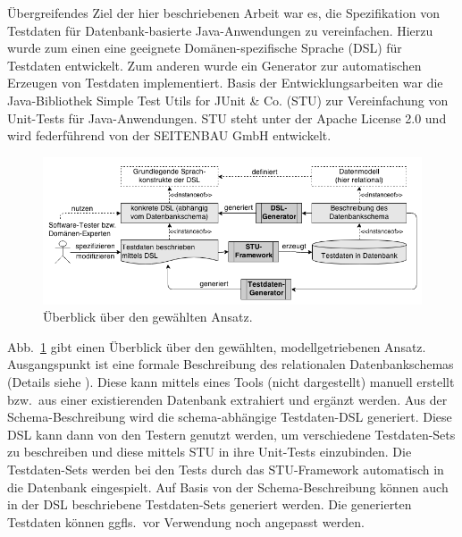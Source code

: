 Übergreifendes Ziel der hier beschriebenen Arbeit \cite{MT:Moll:2013} war es, die Spezifikation von Testdaten für Datenbank-basierte Java-Anwendungen zu vereinfachen.
%
Hierzu wurde zum einen  eine geeignete Domänen-spezifische Sprache (DSL) für Testdaten entwickelt.
%
%
Zum anderen wurde ein Generator zur automatischen Erzeugen von Testdaten implementiert. 
%
%
%
Basis der Entwicklungsarbeiten war die Java-Bibliothek Simple Test Utils for JUnit \& Co. (STU) zur Vereinfachung von Unit-Tests für Java-Anwendungen.
%
STU steht unter der Apache License 2.0 und wird federführend von der  SEITENBAU GmbH entwickelt. 
%


\begin{figure}[tb]
	\begin{center}
		\includegraphics[width=12.75cm]{images/ansatz.png}
		\caption{\label{ansatz}Überblick über den gewählten Ansatz.}
	\end{center}
\end{figure}

Abb.~\ref{ansatz} gibt einen Überblick über den gewählten, modellgetriebenen Ansatz.
%
Ausgangspunkt ist eine formale Beschreibung des relationalen Datenbankschemas (Details siehe \cite{MT:Moll:2013}).
%
Diese kann mittels eines Tools (nicht dargestellt) manuell erstellt bzw.~aus einer existierenden Datenbank extrahiert und ergänzt werden.
%
Aus der Schema-Beschreib\-ung wird die schema-abhängige Testdaten-DSL generiert. 
%
Diese DSL kann dann von den Testern genutzt werden, um verschiedene Testdaten-Sets zu beschreiben und diese mittels STU in ihre Unit-Tests einzubinden.
%
Die Testdaten-Sets werden bei den Tests durch das STU-Framework automatisch in die Datenbank eingespielt.
%
%
Auf Basis von der Schema-Be\-schrei\-bung können auch in der DSL beschriebene Test\-da\-ten-Sets  generiert werden. Die generierten Testdaten können ggfls.~vor Verwendung noch angepasst werden.
%
%
%





	




